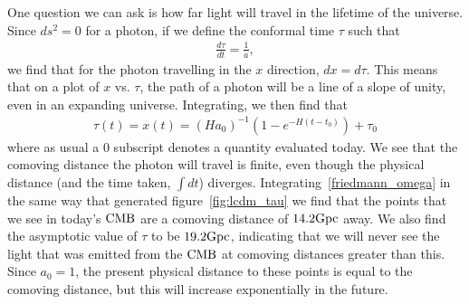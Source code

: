     One question we can ask is how far light will travel in the lifetime of the universe.
    Since $ds^2=0$ for a photon, if we define the conformal time $\tau$ such that
    \begin{align}\label{conformal_time_defn}
        \frac{d\tau}{dt} = \frac{1}{a},
    \end{align}
    we find that for the photon travelling in the $x$ direction, $dx=d\tau$.
    This means that on a plot of $x$ vs. $\tau$, the path of a photon
    will be a line of a slope of unity, even in an expanding universe.
    Integrating, we then find that
    \begin{align}
        \tau(t)=x(t)=(Ha_0)^{-1}\left(1-e^{-H(t-t_0)}\right)+\tau_0
    \end{align}
    where as usual a $0$ subscript denotes a quantity evaluated today.
    We see that the comoving distance the photon will travel is finite, even though the physical
    distance (and the time taken, $\int dt$) diverges.
    Integrating~\eqref{friedmann_omega} in the same way that generated figure~\ref{fig:lcdm_tau}
    we find that the points that we see in today's $\text{CMB}$ are a comoving distance of $14.2\text{Gpc}$ away.
    We also find the asymptotic value of $\tau$ to be $19.2\text{Gpc}$, indicating that we will never see the
    light that was emitted from the $\text{CMB}$ at comoving distances greater than this.
    Since $a_0=1$, the present physical distance to these points is equal to the comoving distance,
    but this will increase exponentially in the future.

